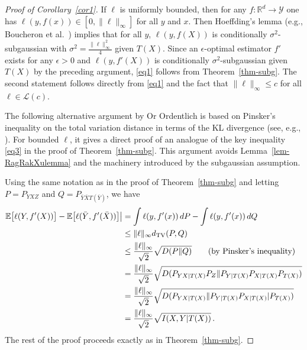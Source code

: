 \documentclass[11pt]{article}
\def\R{{\mathbb R}}
\def\Y{\mathcal{Y}}
\def\L{\mathcal{L}}
\def\EXP {{\mathbb E}}
\begin{document}
\begin{proof}[Proof of Corollary~\ref{cor1}]
 If $\ell$ is
  uniformly bounded, then for any   $f:\R^d\to \Y$ one has   $\ell(y,f(x)) \in [0,
  \|\ell\|_{\infty}]$ for all $y$ and $x$. Then 
   Hoeffding's lemma (e.g., Boucheron et al.\  
  \cite[Lemma~2.2]{BuLuMa13}) implies that for all $y$, 
  $\ell(y,f(X))$ is conditionally  $\sigma^2$-subgaussian with
  $\sigma^2= \frac{\|\ell\|_{\infty}^2}{4}$ given $T(X)$.  Since  an
  $\epsilon$-optimal estimator $f'$ exists for any $\epsilon>0$ and
  $\ell(y,f'(X))$ is conditionally 
  $\sigma^2$-subgaussian given $T(X)$ by the preceding argument, \eqref{eq1}   
  follows from Theorem~\ref{thm-subg}. The second statement follows directly from   \eqref{eq1}  and the fact that $\|\ell\|_{\infty}\le c$ for all $\ell\in \L(c)$. 

The following alternative argument by Or Ordentlich  \cite{OrSh20} is based on Pinsker's inequality on the total variation distance  in terms of the KL divergence (see, e.g.,  \cite[Theorem~7.9]{PoWu22}).  For bounded $\ell$, it gives a direct proof of an analogue of the key inequality \eqref{eq3} in the proof of Theorem~\ref{thm-subg}. This argument avoids Lemma~\ref{lem-RagRakXulemma}
 and the machinery introduced by the subgaussian assumption.
 
Using the same notation as in the proof of Theorem~\ref{thm-subg} and letting $P=P_{YXZ}$ and
  $Q=P_{\bar{Y}\bar{X}T(\bar{Y})}$,  we have 
  \begin{align*}
    \EXP \big[\ell(Y,f'(X))\big]  - \EXP \big[ \ell(\bar{Y},f'(\bar{X}))\big]  \big| &=                \int \ell(y,f'(x)) \, dP - \int \ell(y,f'(x)) \, dQ \nonumber\\
   & \le \|\ell\|_{\infty} d_{\rm TV}(P,Q) \nonumber  \\
 &\le   \frac{\|\ell\|_{\infty}}{\sqrt{2}}   \sqrt{D(P\|Q)
        } \qquad  \text{(by Pinsker's inequality)}  \nonumber  \\
      &= \frac{\|\ell\|_{\infty}}{\sqrt{2}}  \sqrt{D(P_{YX|T(X)}P_Z\|P_{Y|T(X)} P_{X|T(X)} P_{T(X)})} \nonumber \\   
    &= \frac{\|\ell\|_{\infty}}{\sqrt{2}}  \sqrt{D(P_{YX|T(X)}\|P_{Y|T(X)} P_{X|T(X)}| P_{T(X)})}  \nonumber \\
    &=  \frac{\|\ell\|_{\infty}}{\sqrt{2}}  \sqrt{I(X,Y|T(X))}\, . \nonumber 
  \end{align*}
 The rest of the proof proceeds exactly as in Theorem~\ref{thm-subg}. 
\end{proof}
\end{document}
